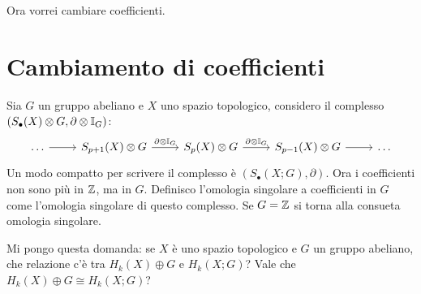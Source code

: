 Ora vorrei cambiare coefficienti.

\section{Cambiamento di coefficienti}

Sia $ G $ un gruppo abeliano e $ X $ uno spazio topologico, considero il complesso
$ (S_\bullet(X) \otimes G, \partial \otimes \mathbb{I}_{G}) $:
\[
  \begin{tikzcd}
    \dots \rar & S_{p+1}(X) \otimes G \rar{\partial \otimes \Id{G}} & S_p(X) \otimes G \rar{\partial \otimes \Id{G}} & S_{p-1}(X) \otimes G \rar & \dots
  \end{tikzcd}
\]
Un modo compatto per scrivere il complesso è $ (S_\bullet(X;G), \partial) $. Ora i coefficienti non
sono più in $ \mathbb{Z} $, ma in $ G $. Definisco l'omologia singolare a coefficienti in $ G $
come l'omologia singolare di questo complesso. Se $ G = \mathbb{Z} $ si torna alla consueta omologia
singolare.

Mi pongo questa domanda: se $ X $ è uno spazio topologico e $ G $ un gruppo abeliano, che relazione
c'è tra $ H_k(X) \oplus G $ e $ H_k(X;G) $? Vale che $ H_k(X) \oplus G \cong H_k(X;G) $?

